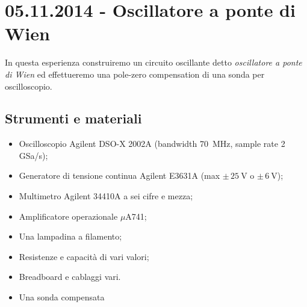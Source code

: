 \section{05.11.2014 - Oscillatore a ponte di Wien}

In questa esperienza construiremo un circuito oscillante detto \textit{oscillatore a ponte di Wien} ed effettueremo una pole-zero compensation di una sonda per oscilloscopio.

\subsection*{Strumenti e materiali}

\begin{itemize} [noitemsep]
	\item Oscilloscopio Agilent DSO-X 2002A (bandwidth \SI{70}{\mega\hertz}, sample rate \num{2} GSa/s);%
		\item Generatore di tensione continua Agilent E3631A (max $\pm \, \SI{25}{\volt}$ o $\pm \, \SI{6}{\volt}$);
		\item Multimetro Agilent 34410A a sei cifre e mezza;
		\item Amplificatore operazionale $\mu$A741;
		\item Una lampadina a filamento;
		\item Resistenze e capacità di vari valori;
		\item Breadboard e cablaggi vari.
		\item Una sonda compensata
\end{itemize}


